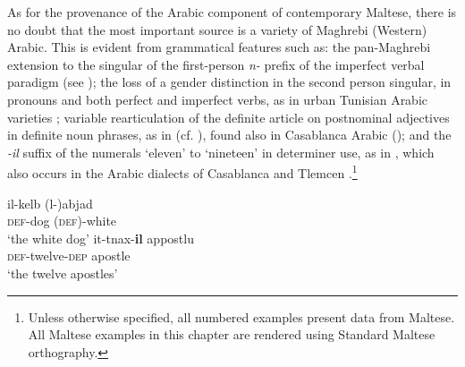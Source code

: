 \documentclass[output=paper]{langsci/langscibook}
\begin{document}
As for the provenance of the Arabic component of contemporary Maltese, there is no doubt that the most important source is a variety of Maghrebi (Western) Arabic. This is evident from grammatical features such as: the pan-Maghrebi extension to the singular of the first-person \textit{n-} prefix of the imperfect verbal paradigm 
(see ); the loss of a gender distinction in the second person singular, in pronouns and both perfect and imperfect verbs, as in urban Tunisian Arabic varieties \citep{Gibson2011}; variable rearticulation of the definite article on postnominal adjectives in definite noun phrases, as in  (cf. \citealt{Gatt2018}), found also in Casablanca Arabic (\citealt[205]{Harrell2004}); and the \textit{-il} suffix of the numerals `eleven' to `nineteen' in determiner use, as in , which also occurs in the Arabic dialects of Casablanca \citep{Caubet2011} and Tlemcen \citep{Taine-Cheikh2011numerals}.\footnote{Unless otherwise specified, all numbered examples present data from Maltese. All Maltese examples in this chapter are rendered using Standard Maltese orthography.}


\begin{table}
\caption{First-person imperfect `write' in Eastern and Western Arabic}
\label{niktib}
\end{table}


\ea\label{ex:optionalarticle}
\gll il-kelb (l-)abjad\\  
     \textsc{def}-dog (\textsc{def})-white\\ 
\glt `the white dog' 
\z
\ea\label{ex:apostles}
\gll it-tnax-\textbf{il} appostlu\\  
     \textsc{def}-twelve-\textsc{dep} apostle\\ 
\glt `the twelve apostles'
\z
\end{document}
